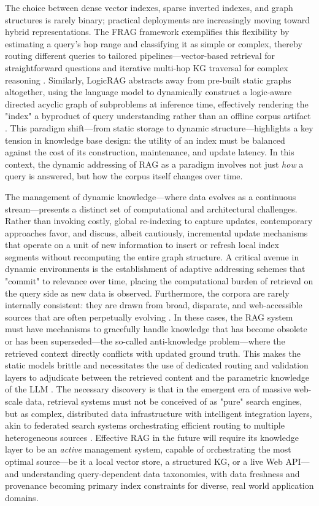 \documentclass[11pt,a4paper]{article}
\begin{document}
The choice between dense vector indexes, sparse inverted indexes, and graph structures is rarely binary; practical deployments are increasingly moving toward hybrid representations. The FRAG framework exemplifies this flexibility by estimating a query's hop range and classifying it as simple or complex, thereby routing different queries to tailored pipelines---vector-based retrieval for straightforward questions and iterative multi-hop KG traversal for complex reasoning \cite{arxiv:2501.09957v2}. Similarly, LogicRAG abstracts away from pre-built static graphs altogether, using the language model to dynamically construct a logic-aware directed acyclic graph of subproblems at inference time, effectively rendering the "index" a byproduct of query understanding rather than an offline corpus artifact \cite{arxiv:2508.06105v2}. This paradigm shift---from static storage to dynamic structure---highlights a key tension in knowledge base design: the utility of an index must be balanced against the cost of its construction, maintenance, and update latency. In this context, the dynamic addressing of RAG as a paradigm involves not just \emph{how} a query is answered, but how the corpus itself changes over time.

The management of dynamic knowledge---where data evolves as a continuous stream---presents a distinct set of computational and architectural challenges. Rather than invoking costly, global re-indexing to capture updates, contemporary approaches favor, and discuss, albeit cautiously, incremental update mechanisms that operate on a unit of new information to insert or refresh local index segments without recomputing the entire graph structure. A critical avenue in dynamic environments is the establishment of adaptive addressing schemes that "commit" to relevance over time, placing the computational burden of retrieval on the query side as new data is observed. Furthermore, the corpora are rarely internally consistent: they are drawn from broad, disparate, and web-accessible sources that are often perpetually evolving \cite{arxiv:2411.11895v1}. In these cases, the RAG system must have mechanisms to gracefully handle knowledge that has become obsolete or has been superseded---the so-called anti-knowledge problem---where the retrieved context directly conflicts with updated ground truth. This makes the static models brittle and necessitates the use of dedicated routing and validation layers to adjudicate between the retrieved content and the parametric knowledge of the LLM \cite{arxiv:2505.23794v2}. The necessary discovery is that in the emergent era of massive web-scale data, retrieval systems must not be conceived of as "pure" search engines, but as complex, distributed data infrastructure with intelligent integration layers, akin to federated search systems orchestrating efficient routing to multiple heterogeneous sources \cite{arxiv:2502.19280v2}. Effective RAG in the future will require its knowledge layer to be an \emph{active} management system, capable of orchestrating the most optimal source---be it a local vector store, a structured KG, or a live Web API---and understanding query-dependent data taxonomies, with data freshness and provenance becoming primary index constraints for diverse, real world application domains.
\end{document}
